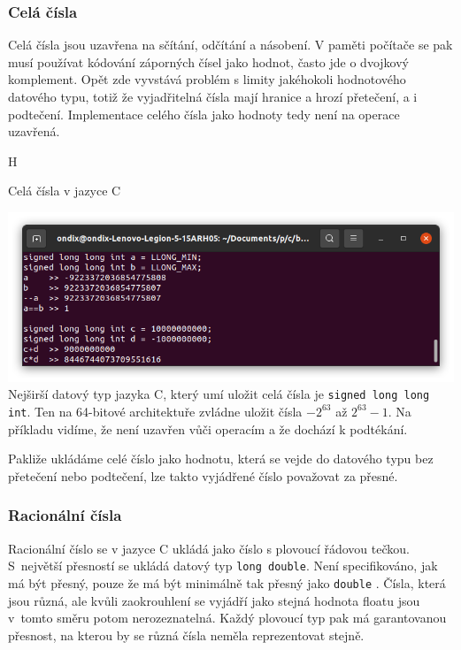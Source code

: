\subsubsection{Celá čísla}
Celá čísla jsou uzavřena na sčítání, odčítání a násobení. V paměti počítače se pak musí používat kódování záporných čísel jako hodnot, často jde o dvojkový komplement. Opět zde vyvstává problém s limity jakéhokoli hodnotového datového typu, totiž že vyjadřitelná čísla mají hranice a hrozí přetečení, a i podtečení. Implementace celého čísla jako hodnoty tedy není na operace uzavřená.

\begin{myfigure}{H}
\caption{Celá čísla v jazyce C}
\includegraphics[width=\linewidth]{./graphics/inty.png}\label{obr:inty}
Nejširší datový typ jazyka C, který umí uložit celá čísla je \texttt{signed long long int}. Ten na 64-bitové architektuře zvládne uložit čísla $-2^{63}$ až $2^{63}-1$. Na příkladu vidíme, že není uzavřen vůči operacím a že dochází k podtékání.
\end{myfigure}

Pakliže ukládáme celé číslo jako hodnotu, která se vejde do datového typu bez přetečení nebo podtečení, lze takto vyjádřené číslo považovat za přesné.

\subsubsection{Racionální čísla}
Racionální číslo se v jazyce C ukládá jako číslo s plovoucí řádovou tečkou. S~největší přesností se ukládá datový typ \texttt{long double}. Není specifikováno, jak má být přesný, pouze že má být minimálně tak přesný jako \texttt{double} \cite{wiki:LD}. Čísla, která jsou různá, ale kvůli zaokrouhlení se vyjádří jako stejná hodnota floatu jsou v~tomto směru potom nerozeznatelná. Každý plovoucí typ pak má garantovanou přesnost, na kterou by se různá čísla neměla reprezentovat stejně.

